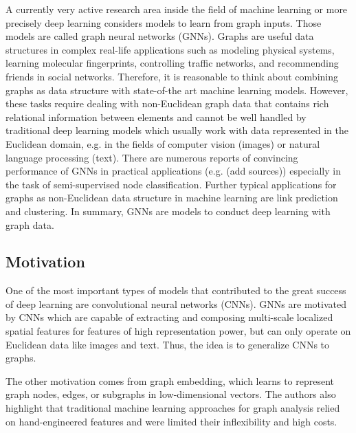 \documentclass[a4paper,preprint]{sig-alternate}
\begin{document}
A currently very active research area inside the field of machine learning or more precisely deep learning considers models to learn
from graph inputs. Those models are called graph neural networks (GNNs). Graphs are useful data structures in complex real-life
applications such as modeling physical systems, learning molecular fingerprints, controlling traffic networks, and recommending 
friends in social networks.\cite{article}
Therefore, it is reasonable to think about combining graphs as data structure with state-of-the art machine learning models.
However, these tasks require dealing with non-Euclidean graph data that contains rich relational information between elements and
cannot be well handled by traditional deep learning models which usually work with data represented in the Euclidean domain, e.g. in the
fields of computer vision (images) or natural language processing (text).\cite{article}\newline
There are numerous reports of convincing performance of GNNs in practical applications (e.g. (add sources))
especially in the task of semi-supervised node classification.\cite{xu2019topology}
Further typical applications for graphs as non-Euclidean data structure in machine learning are link prediction and clustering.\cite{zhou2019graph}\newline
In summary, GNNs are models to conduct deep learning with graph data.\newline

\subsection{Motivation}

One of the most important types of models that contributed to the great success of deep learning are convolutional neural networks (CNNs).
GNNs are motivated by CNNs which are capable of extracting and composing multi-scale localized spatial features
for features of high representation power, but can only operate on Euclidean data like images and text.\cite{article}
Thus, the idea is to generalize CNNs to graphs.\newline

The other motivation comes from graph embedding, which learns to represent graph nodes, edges, or subgraphs in low-dimensional vectors.\cite{article}
The authors also highlight that traditional machine learning approaches for graph analysis relied on hand-engineered features and were limited their
inflexibility and high costs.\newline
\end{document}
